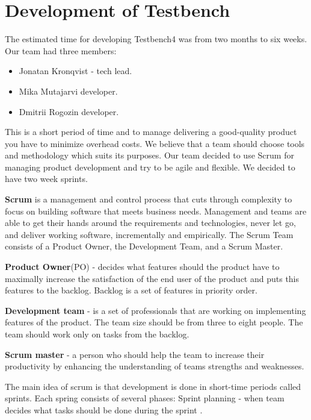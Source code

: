 \chapter{Development of Testbench}
\label{ch:testbenchdevelop}
  
  The estimated time for developing Testbench4 was from two months to six weeks.
  Our team had three members:
  \begin{itemize}
    \item Jonatan Kronqvist - tech lead.
    \item Mika Mutajarvi developer.
    \item Dmitrii Rogozin developer.
  \end{itemize}
  
   This is a short period of time and to manage delivering a good-quality product you
    have to minimize overhead costs. We believe that a team should choose tools
    and methodology which suits its purposes. 
    Our team decided to use Scrum for managing product development and try to be agile and flexible.
    We decided to have two week sprints.

    \textbf{Scrum} is a management and control process that cuts through
    complexity to focus on building software that meets business needs. Management and teams are able to get their
    hands around the requirements and technologies, never let go, and deliver working software,
    incrementally and empirically. The Scrum Team consists of a Product Owner,
    the Development Team, and a Scrum Master.
    
  \textbf{Product Owner}(PO) - decides what features should the product have to
  maximally increase the satisfaction of the end user of the product and puts this features to the backlog.
  Backlog is a set of features in priority order.
  
  \textbf{Development team} - is
  a set of professionals that are working on implementing features of the product. 
  The team size should be from three to eight people. The team should work only on tasks from the backlog.
  
  \textbf{Scrum master} - a person who should help the team to increase their
  productivity by enhancing the understanding of teams strengths and weaknesses.

  The main idea of scrum is that development is done in short-time periods
  called sprints. Each spring consists of several phases:
  Sprint planning - when team decides what tasks should be done during the
  sprint .

